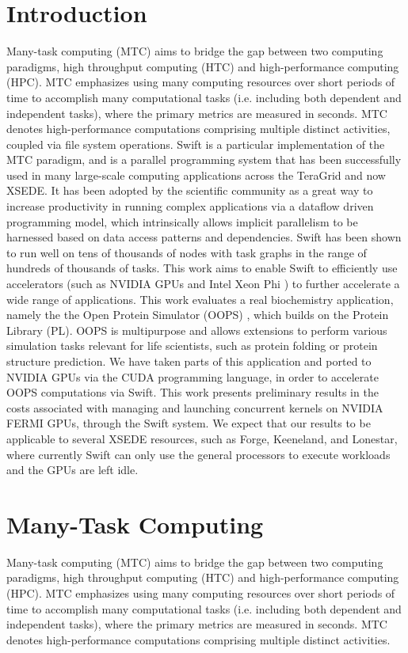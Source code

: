 \documentclass[conference]{IEEEtran}
\begin{document}
\section{Introduction}
Many-task computing (MTC) \cite{raicu2008toward} aims to bridge the gap between two computing paradigms, high throughput computing (HTC) and high-performance computing (HPC). MTC emphasizes using many computing resources over short periods of time to accomplish many computational tasks (i.e. including both dependent and independent tasks), where the primary metrics are measured in seconds. MTC denotes high-performance computations comprising multiple distinct activities, coupled via file system operations. Swift is a particular implementation of the MTC paradigm, and is a parallel programming system that has been successfully used in many large-scale computing applications across the TeraGrid and now XSEDE. \cite{zhao2007swift} It has been adopted by the scientific community as a great way to increase productivity in running complex applications via a dataflow driven programming model, which intrinsically allows implicit parallelism to be harnessed based on data access patterns and dependencies. Swift has been shown to run well on tens of thousands of nodes with task graphs in the range of hundreds of thousands of tasks. This work aims to enable Swift to efficiently use accelerators (such as NVIDIA GPUs and Intel Xeon Phi \cite{Xeon_Phi_web}) to further accelerate a wide range of applications. This work evaluates a real biochemistry application, namely the the Open Protein Simulator (OOPS) \cite{OOPS}, which builds on the Protein Library (PL). OOPS is multipurpose and allows extensions to perform various simulation tasks relevant for life scientists, such as protein folding or protein structure prediction. We have taken parts of this application and ported to NVIDIA GPUs via the CUDA programming language, in order to accelerate OOPS computations via Swift. This work presents preliminary results in the costs associated with managing and launching concurrent kernels on NVIDIA FERMI GPUs, through the Swift system. We expect that our results to be applicable to several XSEDE resources, such as Forge, Keeneland, and Lonestar, where currently Swift can only use the general processors to execute workloads and the GPUs are left idle.

\section{Many-Task Computing}
Many-task computing (MTC) aims to bridge the gap between two computing paradigms, high throughput computing (HTC) and high-performance computing (HPC). MTC emphasizes using many computing resources over short periods of time to accomplish many computational tasks (i.e. including both dependent and independent tasks), where the primary metrics are measured in seconds. MTC denotes high-performance computations comprising multiple distinct activities.
\end{document}
